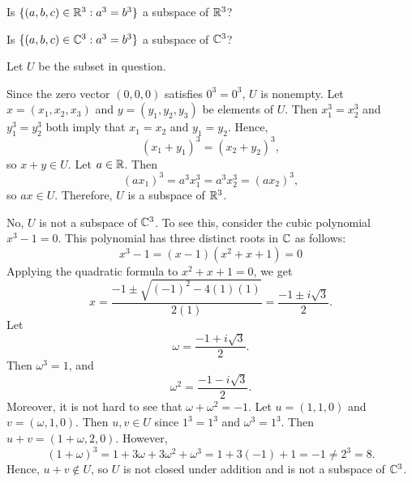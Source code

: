 \begin{exc}
\begin{exercise}\leavevmode
\begin{parts}
\item Is $\{(a,b,c)\in\mathbb{R}^3 : a^3=b^3\}$ a subspace of $\mathbb{R}^3$?
\item Is $\{(a,b,c)\in\mathbb{C}^3 : a^3=b^3\}$ a subspace of $\mathbb{C}^3$?
\end{parts}
\end{exercise}
\begin{solution}
Let $U$ be the subset in question.
\begin{parts}
\item Since the zero vector $(0,0,0)$ satisfies $0^3=0^3$, $U$ is nonempty. Let
  $x=(x_1,x_2,x_3)$ and $y=(y_1,y_2,y_3)$ be elements of $U$. Then
  $x_1^3=x_2^3$ and $y_1^3=y_2^3$ both imply that $x_1=x_2$ and $y_1=y_2$.
  Hence,
  \[ (x_1+y_1)^3 = (x_2+y_2)^3, \]
  so $x+y\in U$. Let $a\in\mathbb{R}$. Then
  \[ (ax_1)^3 = a^3x_1^3 = a^3x_2^3 = (ax_2)^3, \]
  so $ax\in U$. Therefore, $U$ is a subspace of $\mathbb{R}^3$.
\item No, $U$ is not a subspace of $\mathbb{C}^3$. To see this, consider the cubic
  polynomial $x^3-1=0$. This polynomial has three distinct roots in $\mathbb{C}$ as
  follows:
  \[ x^3-1 = (x-1)(x^2+x+1) = 0 \]
  Applying the quadratic formula to $x^2+x+1=0$, we get
  \[ x = \frac{-1\pm\sqrt{(-1)^2-4(1)(1)}}{2(1)} = \frac{-1\pm i\sqrt3}{2}. \]
  Let
  \[ \omega = \frac{-1+i\sqrt3}{2}. \]
  Then $\omega^3=1$, and
  \[ \omega^2 = \frac{-1-i\sqrt3}{2}. \]
  Moreover, it is not hard to see that $\omega+\omega^2=-1$. Let $u=(1,1,0)$
  and $v=(\omega,1,0)$. Then $u,v\in U$ since $1^3=1^3$ and $\omega^3=1^3$.
  Then $u+v=(1+\omega,2,0)$. However,
  \[ (1+\omega)^3 = 1+3\omega+3\omega^2+\omega^3 = 1+3(-1)+1 = -1 \ne 2^3 = 8. \]
  Hence, $u+v\notin U$, so $U$ is not closed under addition and is not a
  subspace of $\mathbb{C}^3$.
\end{parts}
\end{solution}


\end{exc}
